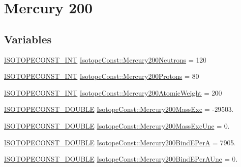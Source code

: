 \hypertarget{group___isotope_const-_mercury-_hg200}{}\section{Mercury 200}
\label{group___isotope_const-_mercury-_hg200}
\subsection*{Variables}
\begin{DoxyCompactItemize}
\item 
\mbox{\hyperlink{group___isotope_const-_macros_ga5f18360b3e99483a35c32d789e62621c}{I\+S\+O\+T\+O\+P\+E\+C\+O\+N\+S\+T\+\_\+\+I\+NT}} \mbox{\hyperlink{group___isotope_const-_mercury-_hg200_gac0315dd8896d67933f2467b72f146458}{Isotope\+Const\+::\+Mercury200\+Neutrons}} = 120
\item 
\mbox{\hyperlink{group___isotope_const-_macros_ga5f18360b3e99483a35c32d789e62621c}{I\+S\+O\+T\+O\+P\+E\+C\+O\+N\+S\+T\+\_\+\+I\+NT}} \mbox{\hyperlink{group___isotope_const-_mercury-_hg200_gafd85b90c2059ac20ba9bb72d7abf1901}{Isotope\+Const\+::\+Mercury200\+Protons}} = 80
\item 
\mbox{\hyperlink{group___isotope_const-_macros_ga5f18360b3e99483a35c32d789e62621c}{I\+S\+O\+T\+O\+P\+E\+C\+O\+N\+S\+T\+\_\+\+I\+NT}} \mbox{\hyperlink{group___isotope_const-_mercury-_hg200_ga67eb9a37f9b7812e858a3f2d2a8bfd76}{Isotope\+Const\+::\+Mercury200\+Atomic\+Weight}} = 200
\item 
\mbox{\hyperlink{group___isotope_const-_macros_ga8f45a7272ce02c0b4c65c44636ed719a}{I\+S\+O\+T\+O\+P\+E\+C\+O\+N\+S\+T\+\_\+\+D\+O\+U\+B\+LE}} \mbox{\hyperlink{group___isotope_const-_mercury-_hg200_ga83af034bbdd29a352376cb4221ca7f71}{Isotope\+Const\+::\+Mercury200\+Mass\+Exc}} = -\/29503.
\item 
\mbox{\hyperlink{group___isotope_const-_macros_ga8f45a7272ce02c0b4c65c44636ed719a}{I\+S\+O\+T\+O\+P\+E\+C\+O\+N\+S\+T\+\_\+\+D\+O\+U\+B\+LE}} \mbox{\hyperlink{group___isotope_const-_mercury-_hg200_ga955c02b253bccfffd7bbc0d7860822bc}{Isotope\+Const\+::\+Mercury200\+Mass\+Exc\+Unc}} = 0.
\item 
\mbox{\hyperlink{group___isotope_const-_macros_ga8f45a7272ce02c0b4c65c44636ed719a}{I\+S\+O\+T\+O\+P\+E\+C\+O\+N\+S\+T\+\_\+\+D\+O\+U\+B\+LE}} \mbox{\hyperlink{group___isotope_const-_mercury-_hg200_ga5835c3de299c26241c7d3febab684319}{Isotope\+Const\+::\+Mercury200\+Bind\+E\+PerA}} = 7905.
\item 
\mbox{\hyperlink{group___isotope_const-_macros_ga8f45a7272ce02c0b4c65c44636ed719a}{I\+S\+O\+T\+O\+P\+E\+C\+O\+N\+S\+T\+\_\+\+D\+O\+U\+B\+LE}} \mbox{\hyperlink{group___isotope_const-_mercury-_hg200_ga91be1c1b34e6ac100f5e923dc8098ff8}{Isotope\+Const\+::\+Mercury200\+Bind\+E\+Per\+A\+Unc}} = 0.

\end{DoxyCompactItemize}
